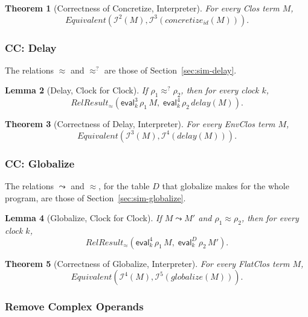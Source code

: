 \documentclass[10pt]{article}
\theoremstyle{acmplain}
\newtheorem{theorem}{Theorem}[section]
\newtheorem{lemma}[theorem]{Lemma}
\newcommand{\key}[1]{\mathsf{#1}}
\newcommand{\pass}[1]{\mathit{#1}}
\newcommand{\Equiv}{\mathit{Equivalent}}
\newcommand{\approxq}{\approx^{?}}
\newcommand{\RelRes}[1]{\mathit{RelResult}_{#1}}
\newcommand{\EV}[2]{\key{eval}^{#1}_{#2}}
\newcommand{\Interp}[1]{\mathcal{I}^{#1}}
\begin{document}
\begin{theorem}[Correctness of Concretize, Interpreter]\label{thm:concretize-clk}
For every Clos term $M$,
\[
  \Equiv(\Interp{2}(M), \Interp{3}(\pass{concretize}_{\mathit{id}}(M))) .
\]
\end{theorem}

\subsubsection{CC: Delay}

The relations $\approx$ and $\approxq$ are those of Section~\ref{sec:sim-delay}.

\begin{lemma}[Delay, Clock for Clock]\label{lem:delay-clk}
If $\rho_1 \approxq \rho_2$, then for every clock $k$,
\[
  \RelRes{\approx}(\EV{3}{k}\,\rho_1\,M,\; \EV{4}{k}\,\rho_2\,\pass{delay}(M)) .
\]
\end{lemma}

\begin{theorem}[Correctness of Delay, Interpreter]\label{thm:delay-clk}
For every EnvClos term $M$,
\[
  \Equiv(\Interp{3}(M), \Interp{4}(\pass{delay}(M))) .
\]
\end{theorem}

\subsubsection{CC: Globalize}

The relations $\leadsto$ and $\approx$, for the table $D$ that globalize makes
for the whole program, are those of Section~\ref{sec:sim-globalize}.

\begin{lemma}[Globalize, Clock for Clock]\label{lem:globalize-clk}
If $M \leadsto M'$ and $\rho_1 \approx \rho_2$, then for every clock $k$,
\[
  \RelRes{\approx}(\EV{4}{k}\,\rho_1\,M,\; \EV{D}{k}\,\rho_2\,M') .
\]
\end{lemma}

\begin{theorem}[Correctness of Globalize, Interpreter]\label{thm:globalize-clk}
For every FlatClos term $M$,
\[
  \Equiv(\Interp{4}(M), \Interp{5}(\pass{globalize}(M))) .
\]
\end{theorem}

\subsubsection{Remove Complex Operands}
\end{document}
